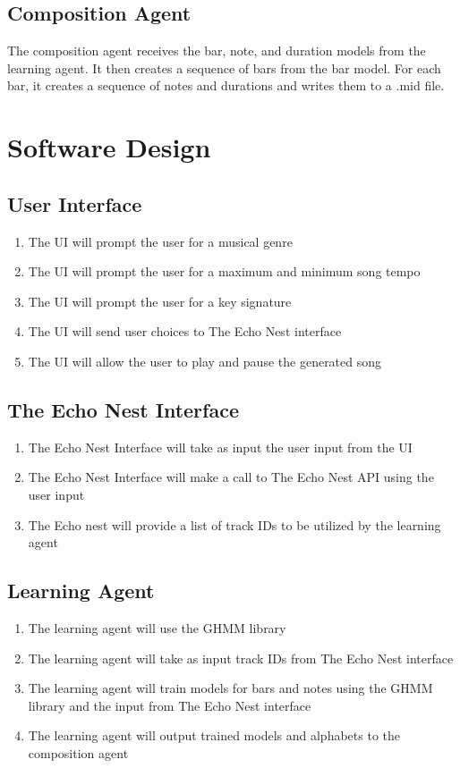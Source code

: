 \documentclass{article}
\begin{document}
\subsection{Composition Agent}
The composition agent receives the bar, note, and duration models from the learning agent. It then creates a sequence of bars from the bar model. For each bar, it creates a sequence of notes and durations and writes them to a .mid file.

\section{Software Design}
\subsection{User Interface}
 \begin{enumerate}
  \item The UI will prompt the user for a musical genre
  \item The UI will prompt the user for a maximum and minimum song tempo
  \item The UI will prompt the user for a key signature
  \item The UI will send user choices to The Echo Nest interface
  \item The UI will allow the user to play and pause the generated song
  \end{enumerate}

\subsection{The Echo Nest Interface}
 \begin{enumerate}
 \item The Echo Nest Interface will take as input the user input from the UI
 \item The Echo Nest Interface will make a call to The Echo Nest API using the user input
  \item The Echo nest will provide a list of track IDs to be utilized by the learning agent
  \end{enumerate}

\subsection{Learning Agent}
  \begin{enumerate}
  \item The learning agent will use the GHMM library
  \item The learning agent will take as input track IDs from The Echo Nest interface
  \item The learning agent will train models for bars and notes using the GHMM library and the input from The Echo Nest interface
  \item The learning agent will output trained models and alphabets to the composition agent
 \end{enumerate}
\end{document}
